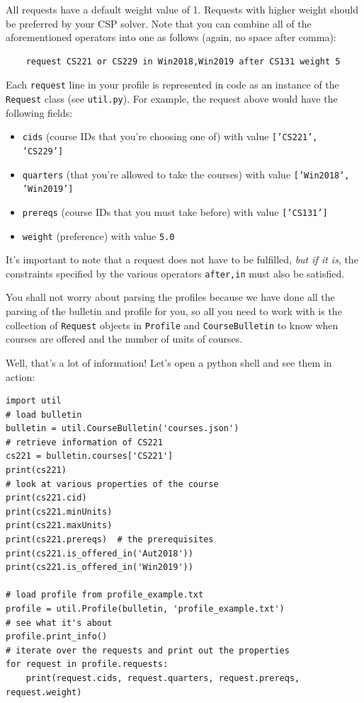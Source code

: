 \documentclass{article}
\theoremstyle{case}
\theoremstyle{definition}
\begin{document}
\begin{itemize}
    All requests have a default weight value of 1. Requests with higher weight should be preferred by your CSP solver. Note that you can combine all of the aforementioned operators into one as follows (again, no space after comma):
    \begin{verbatim}
    request CS221 or CS229 in Win2018,Win2019 after CS131 weight 5
    \end{verbatim}
\end{itemize}

Each \texttt{request} line in your profile is represented in code as an instance of the \texttt{Request} class (see \texttt{util.py}). For example, the request above would have the following fields:
\begin{itemize}
    \item \texttt{cids} (course IDs that you're choosing one of) with value \texttt{['CS221', 'CS229']}
    \item \texttt{quarters} (that you're allowed to take the courses) with value \texttt{['Win2018', 'Win2019']}
    \item \texttt{prereqs} (course IDs that you must take before) with value \texttt{['CS131']}
    \item \texttt{weight} (preference) with value \texttt{5.0}
\end{itemize}

It's important to note that a request does not have to be fulfilled, \emph{but if it is}, the constraints specified by the various operators \texttt{after,in} must also be satisfied.

You shall not worry about parsing the profiles because we have done all the parsing of the bulletin and profile for you, so all you need to work with is the collection of \texttt{Request} objects in \texttt{Profile} and \texttt{CourseBulletin} to know when courses are offered and the number of units of courses.

Well, that's a lot of information! Let's open a python shell and see them in action:
\begin{verbatim}
import util
# load bulletin
bulletin = util.CourseBulletin('courses.json')
# retrieve information of CS221
cs221 = bulletin.courses['CS221']
print(cs221)
# look at various properties of the course
print(cs221.cid)
print(cs221.minUnits)
print(cs221.maxUnits)
print(cs221.prereqs)  # the prerequisites
print(cs221.is_offered_in('Aut2018'))
print(cs221.is_offered_in('Win2019'))

# load profile from profile_example.txt
profile = util.Profile(bulletin, 'profile_example.txt')
# see what it's about
profile.print_info()
# iterate over the requests and print out the properties
for request in profile.requests:
    print(request.cids, request.quarters, request.prereqs, request.weight)
\end{verbatim}
\end{document}

